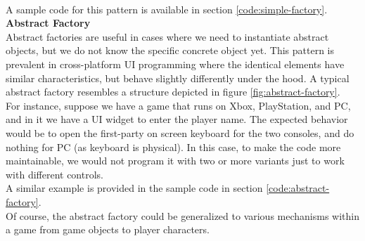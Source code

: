 \begin{multicols}{2}
\\
A sample code for this pattern is available in section \ref{code:simple-factory}.\bs
\\
\textbf{Abstract Factory}
\\
Abstract factories are useful in cases where we need to instantiate abstract objects, but we do not know the specific concrete object yet\cite{sm-abstract-factory}. This pattern is prevalent in cross-platform UI programming where the identical elements have similar characteristics, but behave slightly differently under the hood. A typical abstract factory resembles a structure depicted in figure \ref{fig:abstract-factory}.\cite{ctan-abstract-factory}\bs
\\
For instance, suppose we have a game that runs on Xbox, PlayStation, and PC, and in it we have a UI widget to enter the player name. The expected behavior would be to open the first-party on screen keyboard for the two consoles, and do nothing for PC (as keyboard is physical). In this case, to make the code more maintainable, we would not program it with two or more variants just to work with different controls.\bs
\\
A similar example is provided in the sample code in section \ref{code:abstract-factory}\cite{sm-abstract-factory-example}.\bs
\\
Of course, the abstract factory could be generalized to various mechanisms within a game from game objects to player characters.\bs
\\

\iftwocolumns
\end{multicols}
\fi

